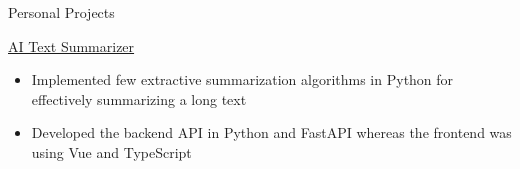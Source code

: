 \documentclass{article}
\newlength{\tabin}
\newlength{\secsep}
\newcommand{\lineunder}{\vspace*{-8pt} \\ \hspace*{-6pt} \hrulefill \\ \vspace*{-15pt}}
\newenvironment{tabbedsection}[1]{
  \begin{list}{}{
      \setlength{\itemsep}{0pt}
      \setlength{\labelsep}{0pt}
      \setlength{\labelwidth}{0pt}
      \setlength{\leftmargin}{\tabin}
      \setlength{\rightmargin}{\tabin}
      \setlength{\listparindent}{0pt}
      \setlength{\parsep}{0pt}
      \setlength{\parskip}{0pt}
      \setlength{\partopsep}{0pt}
      \setlength{\topsep}{#1}
    }
  \item[]
}{\end{list}}
\newenvironment{resume_section}[1]{
  \filbreak
  \vspace{2\secsep}
  \textsc{\large#1}
  \lineunder
  \begin{tabbedsection}{\secsep}
}{\end{tabbedsection}}
\newenvironment{resume_subsection}[2][]{
  \textbf{#2} \hfill {\footnotesize #1} \hspace{2em}
  \begin{tabbedsection}{0.5\secsep}
}{\end{tabbedsection}}
\newenvironment{subitems}{
  \renewcommand{\labelitemi}{-}
  \begin{itemize}
      \setlength{\labelsep}{1em}
}{\end{itemize}}
\begin{document}
\begin{resume_section}{Personal Projects}


  \begin{resume_subsection}{\href{https://github.com/marcustut/summarize}{AI Text Summarizer}}
    \begin{subitems}
      \item Implemented few extractive summarization algorithms in Python for effectively summarizing a long text
      \item Developed the backend API in Python and FastAPI whereas the frontend was using Vue and TypeScript
    \end{subitems}
  \end{resume_subsection}



\end{resume_section}
\end{document}
